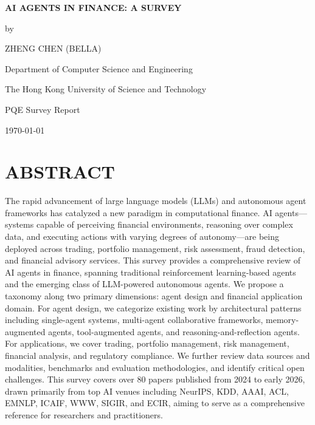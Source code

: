 \documentclass[12pt]{report}
\begin{document}
\begin{titlepage}
\begin{center}
\vspace*{2cm}
{\LARGE \textbf{AI AGENTS IN FINANCE: A SURVEY}}
\vspace{2cm}

{\large by}
\vspace{1cm}

{\large ZHENG CHEN (BELLA)}
\vspace{2cm}

{\large Department of Computer Science and Engineering}

{\large The Hong Kong University of Science and Technology}
\vspace{3cm}

{\large PQE Survey Report}
\vspace{1cm}

{\large \today}
\end{center}
\end{titlepage}

\chapter*{ABSTRACT}

The rapid advancement of large language models (LLMs) and autonomous agent frameworks has catalyzed a new paradigm in computational finance. AI agents---systems capable of perceiving financial environments, reasoning over complex data, and executing actions with varying degrees of autonomy---are being deployed across trading, portfolio management, risk assessment, fraud detection, and financial advisory services. This survey provides a comprehensive review of AI agents in finance, spanning traditional reinforcement learning-based agents and the emerging class of LLM-powered autonomous agents. We propose a taxonomy along two primary dimensions: agent design and financial application domain. For agent design, we categorize existing work by architectural patterns including single-agent systems, multi-agent collaborative frameworks, memory-augmented agents, tool-augmented agents, and reasoning-and-reflection agents. For applications, we cover trading, portfolio management, risk management, financial analysis, and regulatory compliance. We further review data sources and modalities, benchmarks and evaluation methodologies, and identify critical open challenges. This survey covers over 80 papers published from 2024 to early 2026, drawn primarily from top AI venues including NeurIPS, KDD, AAAI, ACL, EMNLP, ICAIF, WWW, SIGIR, and ECIR, aiming to serve as a comprehensive reference for researchers and practitioners.
\end{document}
